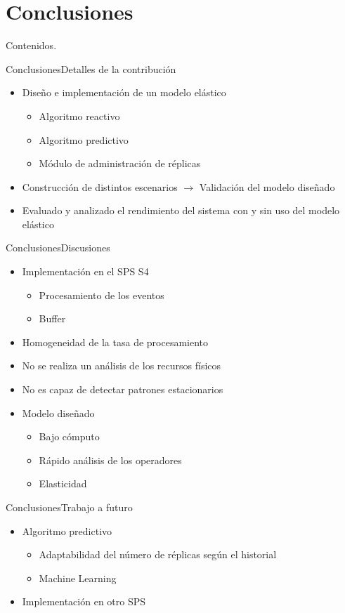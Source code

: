 \section{Conclusiones}

\addtocounter{framenumber}{-1}
\begin{frame}[t]{Contenidos}{\textcolor{UniBlue}{.}}
	\tableofcontents[currentsection]
\end{frame}

\begin{frame}{Conclusiones}{Detalles de la contribución}

\begin{itemize}
\item Diseño e implementación de un modelo elástico
\begin{itemize}
	\item Algoritmo reactivo
	\item Algoritmo predictivo
	\item Módulo de administración de réplicas
\end{itemize}
\item Construcción de distintos escenarios $\rightarrow$ Validación del modelo diseñado
\item Evaluado y analizado el rendimiento del sistema con y sin uso del modelo elástico
\end{itemize}

\end{frame}

\begin{frame}{Conclusiones}{Discusiones}

\begin{itemize}
\item Implementación en el SPS S4
\begin{itemize}
	\item Procesamiento de los eventos
	\item Buffer
\end{itemize}
\item Homogeneidad de la tasa de procesamiento
\item No se realiza un análisis de los recursos físicos
\item No es capaz de detectar patrones estacionarios
\item Modelo diseñado
	\begin{itemize}
		\item Bajo cómputo
		\item Rápido análisis de los operadores
		\item Elasticidad
	\end{itemize}
\end{itemize}

\end{frame}

\begin{frame}{Conclusiones}{Trabajo a futuro}

\begin{itemize}
\item Algoritmo predictivo
\begin{itemize}
	\item Adaptabilidad del número de réplicas según el historial
	\item Machine Learning
\end{itemize}
\item Implementación en otro SPS
\end{itemize}

\end{frame}